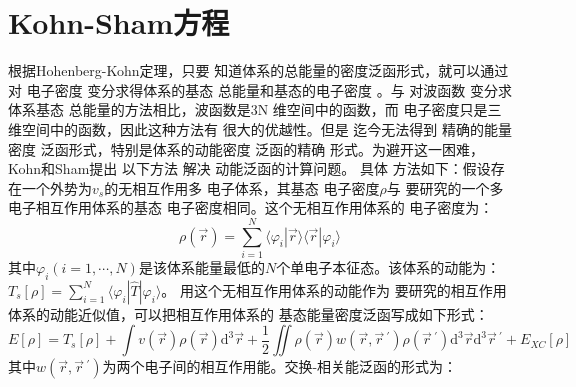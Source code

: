 \section{Kohn-Sham方程}
{根据}Hohenberg-Kohn定理，只要%
{知道}体系的总能量的{密度}泛函形式，就可以通过对%
{电}子密度%
变分求得体系的基态%
{总能量和基态的电}子密度%
。与%
对波函数%
变分求%
体系基态%
{总能量}的方法相比，波函数是3N%
{维空间中的}函数，而%
{电}子密度只是三维{空间中的}函数，因此这种方法有%
{很}大的优越性。但是%
{迄今无法}得到%
精确的能量密度
泛函形式，特别是体系的动能密度
泛函的精确%
{形式。为避开这一困难}，Kohn和Sham\cite{PR140-A1133_1965}提出%
{以下}方法%
解决%
动能泛函的计算问题。%
具体%
方法如下：假设存在一个外势为$v_s$的无相互作用多%
{电}子体系，其基态%
{电}子密度$\rho$与%
{要}研究的一个多电子相互作用体系的基态%
{电}子密度相同。这个无相互作用体系的%
{电}子密度为：
$$\rho(\vec{r})=\sum_{i=1}^{N}\langle\varphi_{i}|\vec{r}\rangle\langle\vec{r}|\varphi_{i}\rangle$$
其中$\varphi_i(i\!=\!1,\cdots,N)$是该体系能量最低的$N$个{单电子}本征态。该体系的动能为：\linebreak $T_{s}[\rho]\!=\!\sum\limits_{i=1}^{N}\langle\varphi_{i}|\hat{T}|\varphi_{i}\rangle$。
用这个无相互作用体系的动能作为%
{要}研究的相互作用体系的动能近似{值}，可以把相互作用体系的%
{基态能量密度泛函}写成如下形式：
\begin{equation}
  \label{eq:dft-1}
E[\rho]=T_{s}[\rho]+\int{v(\vec{r})\rho(\vec{r})\textrm{d}^3\vec{r}}+\frac 12\iint{\rho(\vec{r})w(\vec{r},\vec r\,^{\prime})\rho(\vec r\,^{\prime})\textrm{d}^3\vec{r}\textrm{d}^3\vec r\,^{\prime}}+E_{XC}[\rho]
\end{equation}
其中{$w(\vec r, \vec r\,^{\prime})$为两个电子间的相互作用能。}交换-相关能泛函的形式为：

